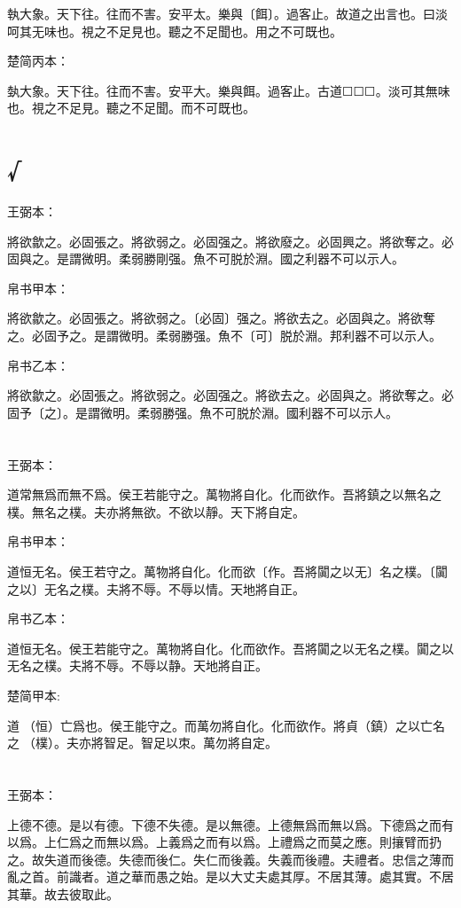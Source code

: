 \documentclass[a5paper]{ctexbook}
\begin{document}
    執大象。天下往。往而不害。安平太。樂與〔餌〕。過客止。故道之出言也。曰淡呵其无味也。視之不足見也。聽之不足聞也。用之不可既也。

    楚简丙本：

    埶大象。天下往。往而不害。安平大。樂與餌。過客止。古道☐☐☐。淡可其無味也。視之不足見。聽之不足聞。而不可既也。

    \chapter{√}
    王弼本：

    將欲歙之。必固張之。將欲弱之。必固强之。將欲廢之。必固興之。將欲奪之。必固與之。是謂微明。柔弱勝剛强。魚不可脱於淵。國之利器不可以示人。

    
    帛书甲本：

    將欲歙之。必固張之。將欲弱之。〔必固〕强之。將欲去之。必固與之。將欲奪之。必固予之。是謂微明。柔弱勝强。魚不〔可〕脱於淵。邦利器不可以示人。

    帛书乙本：

    將欲歙之。必固張之。將欲弱之。必固强之。將欲去之。必固與之。將欲奪之。必固予〔之〕。是謂微明。柔弱勝强。魚不可脱於淵。國利器不可以示人。

    \chapter{}
    王弼本：

    道常無爲而無不爲。侯王若能守之。萬物將自化。化而欲作。吾將鎮之以無名之樸。無名之樸。夫亦將無欲。不欲以靜。天下將自定。

    
    帛书甲本：

    道恒无名。侯王若守之。萬物將自化。化而欲〔作。吾將闐之以无〕名之樸。〔闐之以〕无名之樸。夫將不辱。不辱以情。天地將自正。

    帛书乙本：

    道恒无名。侯王若能守之。萬物將自化。化而欲作。吾將闐之以无名之樸。闐之以无名之樸。夫將不辱。不辱以静。天地將自正。

    楚简甲本:

    道𠄨（恒）亡爲也。侯王能守之。而萬勿將自化。化而欲作。將貞（鎮）之以亡名之󶴯（樸）。夫亦將智足。智足以朿。萬勿將自定。

    \chapter{}
    王弼本：

    上德不德。是以有德。下德不失德。是以無德。上德無爲而無以爲。下德爲之而有以爲。上仁爲之而無以爲。上義爲之而有以爲。上禮爲之而莫之應。則攘臂而扔之。故失道而後德。失德而後仁。失仁而後義。失義而後禮。夫禮者。忠信之薄而亂之首。前識者。道之華而愚之始。是以大丈夫處其厚。不居其薄。處其實。不居其華。故去彼取此。
\end{document}
